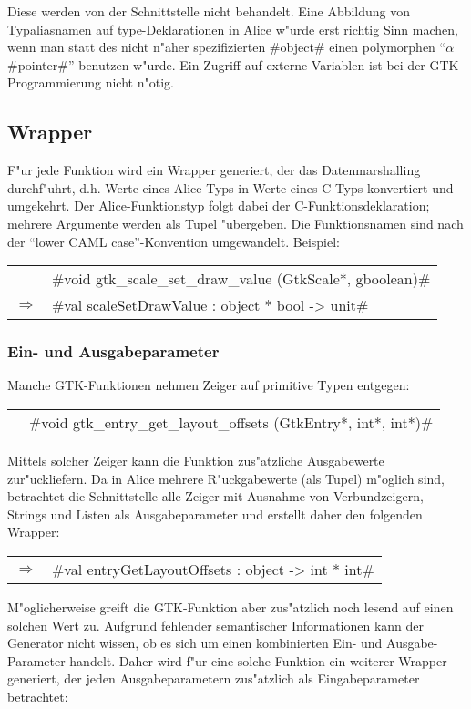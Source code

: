 \documentclass[a4paper,titlepage]{article}
\newcommand{\doparskip}{\bigskip}
\newcommand{\ra}{$\Longrightarrow$}
\begin{document}
Diese werden von
der Schnittstelle nicht behandelt. Eine Abbildung von Typaliasnamen auf
type-Deklarationen in Alice w"urde erst richtig Sinn machen, wenn man
statt des nicht n"aher spezifizierten #object# einen polymorphen
``$\alpha$ #pointer#'' benutzen w"urde. Ein Zugriff auf externe Variablen
ist bei der GTK-Programmierung nicht n"otig.

\subsection{Wrapper}

F"ur jede Funktion wird ein Wrapper generiert, der das
Datenmarshalling durch\-f"uhrt, d.h. Werte eines Alice-Typs in Werte eines
C-Typs konvertiert und umgekehrt. Der Alice-Funktionstyp folgt dabei der
C-Funktionsdeklaration; mehrere Argumente werden als Tupel "ubergeben.
Die Funktionsnamen sind nach der ``lower CAML case''-Konvention
umgewandelt. Beispiel:\doparskip

\begin{tabular}{rl}
      & #void gtk_scale_set_draw_value (GtkScale*, gboolean)# \\
  \ra & #val scaleSetDrawValue : object * bool -> unit#
\end{tabular}

\subsubsection*{Ein- und Ausgabeparameter}

Manche GTK-Funktionen nehmen Zeiger auf primitive Typen entgegen:
\doparskip

\begin{tabular}{rl}
   & #void gtk_entry_get_layout_offsets (GtkEntry*, int*, int*)#
\end{tabular}
\doparskip

Mittels solcher Zeiger kann die Funktion zus"atzliche Ausgabewerte
zur"uckliefern. Da in Alice mehrere R"uckgabewerte (als Tupel) m"oglich sind,
betrachtet die Schnittstelle alle Zeiger mit Ausnahme von Verbundzeigern,
Strings und Listen als Ausgabeparameter und erstellt daher den folgenden
Wrapper:
\doparskip

\begin{tabular}{rl}
  \ra & #val entryGetLayoutOffsets : object -> int * int#
\end{tabular}
\doparskip

M"oglicherweise greift die GTK-Funktion aber zus"atzlich noch lesend auf 
einen solchen Wert zu. Aufgrund fehlender semantischer Informationen kann
der Generator nicht wissen, ob es sich um einen kombinierten Ein- und
Ausgabe-Parameter handelt.
Daher wird f"ur eine solche Funktion ein weiterer Wrapper generiert,
der jeden Ausgabeparametern zus"atzlich als Eingabeparameter betrachtet:
\doparskip
\end{document}
